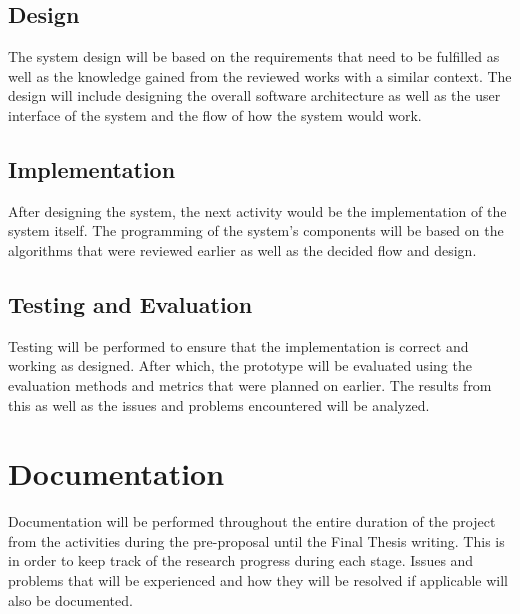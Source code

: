 \subsection{Design}
The system design will be based on the requirements that need to be fulfilled as well as the knowledge gained from the reviewed works with a similar context. The design will include designing the overall software architecture as well as the user interface of the system and the flow of how the system would work.

\subsection{Implementation}
After designing the system, the next activity would be the implementation of the system itself. The programming of the system's components will be based on the algorithms that were reviewed earlier as well as the decided flow and design. 

\subsection{Testing and Evaluation}
Testing will be performed to ensure that the implementation is correct and working as designed. After which, the prototype will be evaluated using the evaluation methods and metrics that were planned on earlier. The results from this as well as the issues and problems encountered will be analyzed.

\section{Documentation}
Documentation will be performed throughout the entire duration of the project from the activities during the pre-proposal until the Final Thesis writing. This is in order to keep track of the research progress during each stage. Issues and problems that will be experienced and how they will be resolved if applicable will also be documented.

